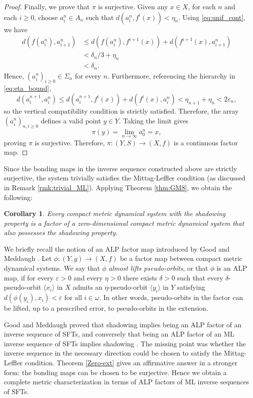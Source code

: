 \documentclass[12pt]{amsart}
\newtheorem{corollary}[theorem]{Corollary}
\theoremstyle{definition}
\numberwithin{equation}{section}
\theoremstyle{remark}
\begin{document}
\begin{proof}
Finally, we prove that $\pi$ is surjective. Given any $x \in X$, for each $n$ and each $i \geq 0$, choose $a_i^n \in A_n$ such that $d(a_i^n, f^i(x)) < \eta_n$. Using \eqref{eq:unif_cont}, we have
\[
\begin{aligned}
        d(f(a_i^n), a_{i+1}^n)
        &\leq
        d(f(a_i^n), f^{i+1}(x)) + d(f^{i+1}(x), a_{i+1}^n) \\
        &<
        \delta_n/3 + \eta_n \\
        &<
        \delta_n.
\end{aligned}
\]
Hence, $(a_i^n)_{i\geq 0} \in \Sigma_n$ for every $n$. Furthermore, referencing the hierarchy in \eqref{eq:eta_bound},
\[
        d(a_i^{n+1}, a_i^n)
        \leq
        d(a_i^{n+1}, f^i(x)) + d(f^i(x), a_i^n)
        <
        \eta_{n+1} + \eta_n
        <
        2\varepsilon_n,
\]
so the vertical compatibility condition is strictly satisfied. Therefore, the array $(a_i^n)_{n,i\geq 0}$ defines a valid point $y \in Y$. Taking the limit gives
\[
        \pi(y) = \lim_{n\to\infty} a_0^n = x,
\]
proving $\pi$ is surjective. Therefore, $\pi:(Y,S)\to(X,f)$ is a continuous factor map.
\end{proof}
 
Since the bonding maps in the inverse sequence constructed above are strictly surjective, the system trivially satisfies the Mittag-Leffler condition (as discussed in Remark \ref{rmk:trivial_ML}). Applying Theorem \ref{thm:GM8}, we obtain the following:

\begin{corollary}
Every compact metric dynamical system with the shadowing property is a factor of a zero-dimensional compact metric dynamical system that also possesses the shadowing property.
\end{corollary}

We briefly recall the notion of an ALP factor map introduced by Good and
Meddaugh \cite{GM}. Let $\phi:(Y,g)\to (X,f)$ be a factor map between compact
metric dynamical systems. We say that $\phi$ \emph{almost lifts pseudo-orbits}, or that
$\phi$ is an ALP map, if for every $\varepsilon>0$ and every $\eta>0$ there exists
$\delta>0$ such that every $\delta$-pseudo-orbit $\langle x_i\rangle$ in $X$ admits
an $\eta$-pseudo-orbit $\langle y_i\rangle$ in $Y$ satisfying
$d(\phi(y_i),x_i)<\varepsilon$ for all $i\in\omega$. In other words, pseudo-orbits
in the factor can be lifted, up to a prescribed error, to pseudo-orbits in the
extension.


Good and Meddaugh proved that shadowing implies being an ALP factor of an
inverse sequence of SFTs, and conversely that being an ALP factor of an ML inverse
sequence of SFTs implies shadowing \cite[Corollary 28]{GM}. The missing point was whether the inverse
sequence in the necessary direction could be chosen to satisfy the Mittag-Leffler
condition. Theorem \ref{Zero-ext} gives an affirmative answer in a
stronger form: the bonding maps can be chosen to be surjective. Hence we obtain a
complete metric characterization in terms of ALP factors of ML inverse sequences
of SFTs.
\end{document}
